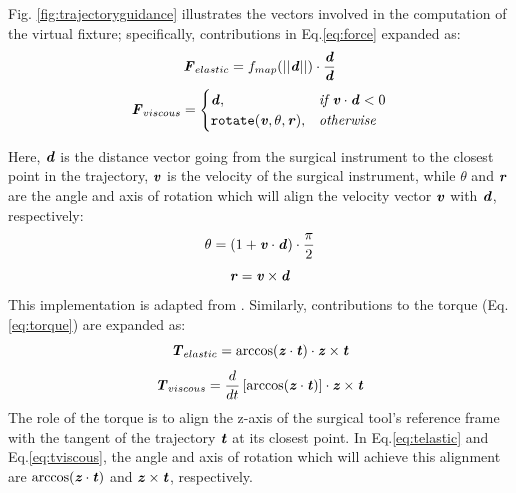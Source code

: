 \documentclass[../main.tex]{subfiles}
\begin{document}
Fig. \ref{fig:trajectoryguidance} illustrates the vectors involved in the computation of the virtual fixture; specifically, contributions in Eq.\ref{eq:force} expanded as:
\begin{equation}
    \textbf{\textit{F}}_{elastic} = f_{map}(||\textbf{\textit{d}}||)\cdot\frac{\textbf{\textit{d}}}{\textbf{\textit{d}}}
\end{equation} 
\begin{equation}
    \textbf{\textit{F}}_{viscous} = 
    \begin{cases} 
        \textbf{\textit{d}}, & \textit{if         } \textbf{\textit{v}}\cdot\textbf{\textit{d}}<0 \\
         \texttt{rotate}(\textbf{\textit{v}},\theta,\textbf{\textit{r}}), & \textit{otherwise}
    \end{cases}
\end{equation} 

Here, $\textbf{\textit{d}}$ is the distance vector going from the surgical instrument to the closest point in the trajectory, $\textbf{\textit{v}}$ is the velocity of the surgical instrument, while $\theta$ and $\textbf{\textit{r}}$ are the angle and axis of rotation which will align the velocity vector $\textbf{\textit{v}}$ with $\textbf{\textit{d}}$, respectively:
\begin{equation}
    \theta = (1+\textbf{\textit{v}}\cdot\textbf{\textit{d}})\cdot\frac{\pi}{2}
\end{equation}
\begin{equation}
    \textbf{\textit{r}} = \textbf{\textit{v}}\times\textbf{\textit{d}}
\end{equation}
This implementation is adapted from \cite{Enayati2016}. Similarly, contributions to the torque (Eq.\ref{eq:torque}) are expanded as: 
\begin{equation}
    \textbf{\textit{T}}_{elastic} = \arccos (\textbf{\textit{z}}\cdot\textbf{\textit{t}} ) \cdot \textbf{\textit{z}} \times \textbf{\textit{t}}
    \label{eq:telastic}
\end{equation}
\begin{equation}
    \textbf{\textit{T}}_{viscous} = \frac{d}{dt} \left[ \arccos (\textbf{\textit{z}}\cdot\textbf{\textit{t}} ) \right] \cdot \textbf{\textit{z}} \times \textbf{\textit{t}}
    \label{eq:tviscous}
\end{equation}
The role of the torque is to align the z-axis of the surgical tool's reference frame with the tangent of the trajectory $\textbf{\textit{t}}$ at its closest point. In Eq.\ref{eq:telastic} and Eq.\ref{eq:tviscous}, the angle and axis of rotation which will achieve this alignment are $\arccos(\textbf{\textit{z}}\cdot\textbf{\textit{t}})$ and $\textbf{\textit{z}} \times \textbf{\textit{t}}$, respectively.

\end{document}
